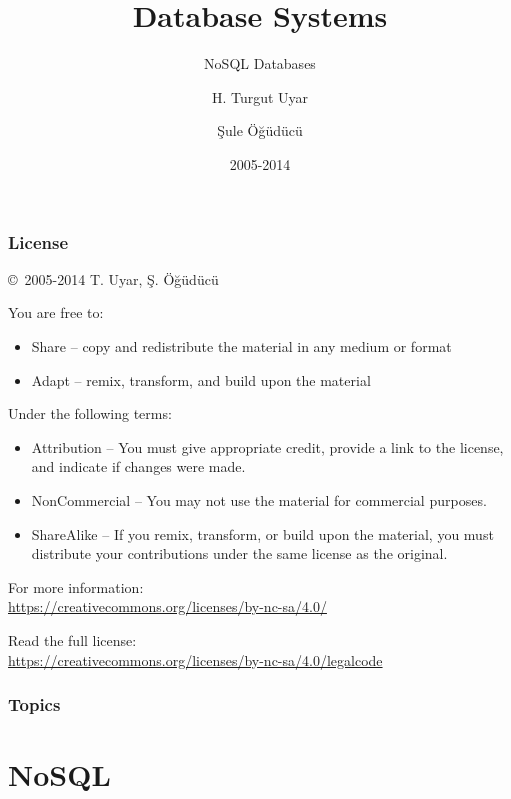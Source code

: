 \documentclass[dvipsnames]{beamer}
\title{Database Systems}
\subtitle{NoSQL Databases}
\author{H. Turgut Uyar \and Şule Öğüdücü}
\date{2005-2014}
\theoremstyle{plain}
\begin{document}
\begin{frame}
  \titlepage
\end{frame}

\begin{frame}
  \frametitle{License}

  \hfill
  \copyright~2005-2014 T. Uyar, Ş. Öğüdücü

  \vfill
  \begin{footnotesize}
    You are free to:
    \begin{itemize}
      \itemsep0em
      \item Share -- copy and redistribute the material in any medium or format
      \item Adapt -- remix, transform, and build upon the material
    \end{itemize}

    Under the following terms:
    \begin{itemize}
      \itemsep0em
      \item Attribution -- You must give appropriate credit, provide a link to
        the license, and indicate if changes were made.

      \item NonCommercial -- You may not use the material for commercial
        purposes.

      \item ShareAlike -- If you remix, transform, or build upon the material,
        you must distribute your contributions under the same license as the
        original.
    \end{itemize}
  \end{footnotesize}

  \begin{small}
    For more information:\\
    \url{https://creativecommons.org/licenses/by-nc-sa/4.0/}

    \smallskip
    Read the full license:\\
    \url{https://creativecommons.org/licenses/by-nc-sa/4.0/legalcode}
  \end{small}
\end{frame}

\begin{frame}
  \frametitle{Topics}
  \tableofcontents
\end{frame}

\section{NoSQL}
\end{document}
